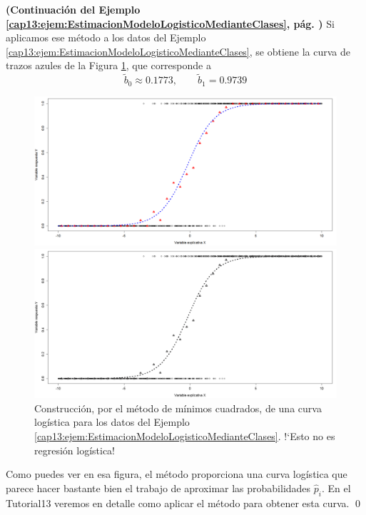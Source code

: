 \begin{ejemplo}
\label{cap13:ejem:CurvaLogisticaPorMinimosCuadrados}
{\bf (Continuación del Ejemplo \ref{cap13:ejem:EstimacionModeloLogisticoMedianteClases}, pág. \pageref{cap13:ejem:EstimacionModeloLogisticoMedianteClases})}
Si aplicamos ese método a los datos del Ejemplo \ref{cap13:ejem:EstimacionModeloLogisticoMedianteClases}, se obtiene la curva de trazos azules de la Figura \ref{cap13:fig:EjemploModeloLogisticoMinimosCuadrados}, que corresponde a
\[\widetilde b_0\approx 0.1773,\qquad \widetilde b_1 = 0.9739\]

\begin{figure}[h!]
\begin{center}
\begin{enColor}
    \includegraphics[width=13cm]{../fig/Cap13-EjemploModeloLogisticoMinimosCuadrados.png}
\end{enColor}
\begin{bn}
    \includegraphics[width=13cm]{../fig/Cap13-EjemploModeloLogisticoMinimosCuadrados-bn.png}
\end{bn}
     \caption{Construcción, por el método de mínimos cuadrados, de una curva logística para los datos del Ejemplo \ref{cap13:ejem:EstimacionModeloLogisticoMedianteClases}. {!`}Esto no es regresión logística! }
     \label{cap13:fig:EjemploModeloLogisticoMinimosCuadrados}
\end{center}
\end{figure}

Como puedes ver en esa figura, el método proporciona una curva logística que parece hacer bastante bien el trabajo de aproximar las probabilidades $\hat p_i$. En el Tutorial13 veremos en detalle como aplicar el método para obtener esta curva.
\qed
\end{ejemplo}


